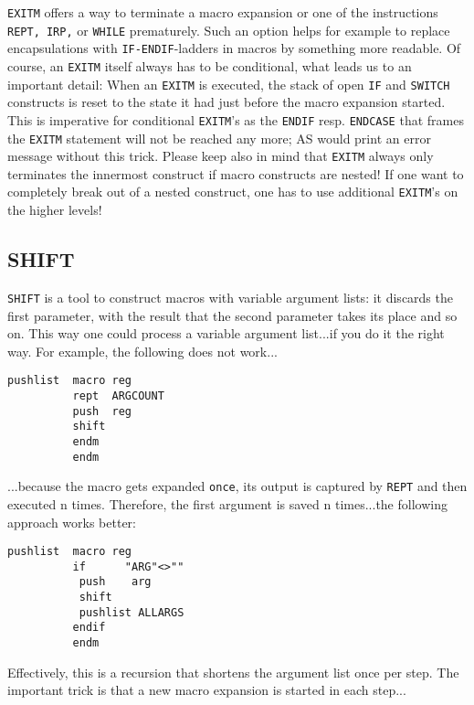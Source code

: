 \documentclass[12pt,twoside]{report}
\makeatletter
\newcommand{\tty}[1]{{\tt #1}}
\newcommand{\ttindex}[1]{\index{#1@{\tt #1}}}
\makeatother
\begin{document}
\tty{EXITM} offers a way to terminate a macro expansion or one of the
instructions \tty{REPT, IRP,} or \tty{WHILE} prematurely.  Such an option
helps for example to replace encapsulations with \tty{IF-ENDIF}-ladders in
macros by something more readable.  Of course, an \tty{EXITM} itself
always has to be conditional, what leads us to an important detail: When
an \tty{EXITM} is executed, the stack of open \tty{IF} and
\tty{SWITCH} constructs is reset to the state it had just before the macro
expansion started.  This is imperative for conditional \tty{EXITM}'s as
the \tty{ENDIF} resp. \tty{ENDCASE} that frames the \tty{EXITM} statement
will not be reached any more; AS would print an error message without this
trick.  Please keep also in mind that \tty{EXITM} always only terminates
the innermost construct if macro constructs are nested!  If one want to
completely break out of a nested construct, one has to use additional
\tty{EXITM}'s on the higher levels!


\subsection{SHIFT}
\ttindex{SHIFT}

{\tt SHIFT} is a tool to construct macros with variable argument lists: it 
discards the first parameter, with the result that the second parameter
takes its place and so on.  This way one could process a variable argument
list...if you do it the right way.  For example, the following does not
work...
\begin{verbatim}   
pushlist  macro reg
          rept  ARGCOUNT
          push  reg
          shift
          endm
          endm
\end{verbatim}
...because the macro gets expanded {\tt once}, its output is captured by
{\tt REPT} and then executed n times.  Therefore, the first argument is
saved n times...the following approach works better:
\begin{verbatim}
pushlist  macro reg
          if      "ARG"<>""
           push    arg
           shift
           pushlist ALLARGS
          endif
          endm 
\end{verbatim} 
Effectively, this is a recursion that shortens the argument list once per
step.  The important trick is that a new macro expansion is started in
each step...

\end{document}
